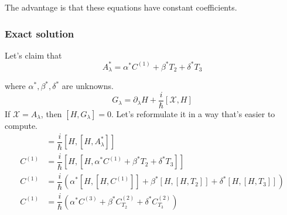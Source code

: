 \documentclass[11pt,a4paper]{article}
\begin{document}
The advantage is that these equations have constant coefficients. 
%
%
%
%
%
\subsubsection{Exact solution}


Let's claim that 
\begin{equation}
 A_{\lambda}^*= \alpha^* C^{(1)} +  \beta^* T_2 + \delta^* T_3 
\end{equation}

where $\alpha^*, \beta^*, \delta^* $ are unknowns. 
\begin{equation}
G_{\lambda}= \partial_{\lambda} H + \dfrac{i}{\hbar} [\mathcal{X}, H] 
\end{equation}
If $\mathcal{X}= A_{\lambda}$, then $[H,G_{\lambda}]=0 $. Let's reformulate it in a way that's easier to compute. 
\begin{align}
[H,\partial_{\lambda} H ] &= \dfrac{i}{\hbar} [H,[H, A_{\lambda}^*]] \\
C^{(1)} &= \dfrac{i}{\hbar} [H,[H,\alpha^* C^{(1)} +  \beta^* T_2 + \delta^* T_3 ]] \\
C^{(1)} &= \dfrac{i}{\hbar} \left (\alpha^* [H,[H, C^{(1)}]]  +  \beta^* [H,[H,  T_2 ]]+  \delta^* [H,[H,  T_3]]  \right)  \\
C^{(1)} &= \dfrac{i}{\hbar} \left (\alpha^* C^{(3)}   + \beta^*   C^{(2)}_{T_2} + \delta^* C^{(2)}_{T_3} \right)
\end{align}
\end{document}

